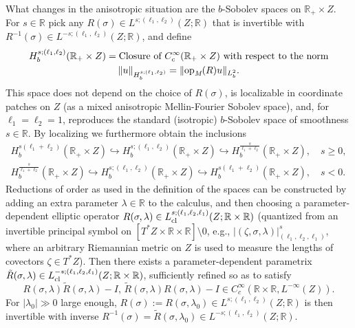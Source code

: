 \documentclass[reqno]{amsart}
\numberwithin{equation}{section}
\theoremstyle{definition}
\def\R{\mathbb R}
\def\opm{\textup{op}_{\textit{M}}}
\begin{document}
What changes in the anisotropic situation are the $b$-Sobolev spaces on $\R_+\times Z$. For $s \in \R$ pick any $R(\sigma) \in L^{s;(\ell_1,\ell_2)}(Z;\R)$ that is invertible with $R^{-1}(\sigma) \in L^{-s;(\ell_1,\ell_2)}(Z;\R)$, and define
\begin{gather*}
H_b^{s;(\ell_1,\ell_2)}(\R_+\times Z) = \textup{Closure of $C_c^{\infty}(\R_+\times Z)$ with respect to the norm} \\
\|u\|_{H_b^{s;(\ell_1,\ell_2)}} = \|\opm(R)u\|_{L^2_b}.
\end{gather*}
This space does not depend on the choice of $R(\sigma)$, is localizable in coordinate patches on $Z$ (as a mixed anisotropic Mellin-Fourier Sobolev space), and, for $\ell_1=\ell_2 = 1$, reproduces the standard (isotropic) $b$-Sobolev space of smoothness $s \in \R$. By localizing we furthermore obtain the inclusions
\begin{equation}\label{HsIncl}
\begin{gathered}
H_b^{s(\ell_1+\ell_2)}(\R_+\times Z) \hookrightarrow H_b^{s;(\ell_1,\ell_2)}(\R_+\times Z) \hookrightarrow H_b^{\frac{s}{\ell_1+\ell_2}}(\R_+\times Z), \quad s \geq 0, \\
H_b^{\frac{s}{\ell_1+\ell_2}}(\R_+\times Z) \hookrightarrow H_b^{s;(\ell_1,\ell_2)}(\R_+\times Z) \hookrightarrow H_b^{s(\ell_1+\ell_2)}(\R_+\times Z),
\quad s < 0.
\end{gathered}
\end{equation}
Reductions of order as used in the definition of the spaces can be constructed by adding an extra parameter $\lambda \in \R$ to the calculus, and then choosing a parameter-dependent elliptic operator $R(\sigma,\lambda) \in L_{\textup{cl}}^{s;(\ell_1,\ell_2,\ell_1)}(Z;\R\times\R)$ (quantized from an invertible principal symbol on $[T^*Z\times\R\times\R]\setminus 0$, e.g., $|(\zeta,\sigma,\lambda)|_{(\ell_1,\ell_2,\ell_1)}^s$, where an arbitrary Riemannian metric on $Z$ is used to measure the lengths of covectors $\zeta \in T^*Z$). Then there exists a parameter-dependent parametrix $\tilde{R}(\sigma,\lambda) \in L_{\textup{cl}}^{-s;(\ell_1,\ell_2,\ell_1)}(Z;\R\times\R)$, sufficiently refined so as to satisfy
$$
R(\sigma,\lambda)\tilde{R}(\sigma,\lambda) - I,\, \tilde{R}(\sigma,\lambda)R(\sigma,\lambda) - I \in C_c^{\infty}(\R\times\R,L^{-\infty}(Z)).
$$
For $|\lambda_0| \gg 0$ large enough, $R(\sigma):= R(\sigma,\lambda_0) \in L^{s;(\ell_1,\ell_2)}(Z;\R)$ is then invertible with inverse $R^{-1}(\sigma) = \tilde{R}(\sigma,\lambda_0) \in L^{-s;(\ell_1,\ell_2)}(Z;\R)$.
\end{document}
